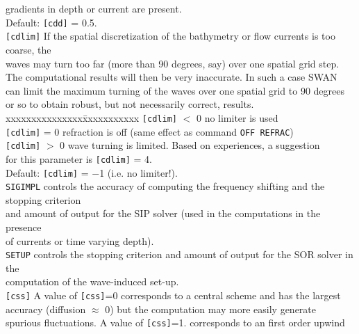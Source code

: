 \documentclass[12pt]{book}
\begin{document}
\begin{tabbing}
                  gradients in depth or current are present.\\
                  Default: {\tt [cdd]} = 0.5.\-\\
{\tt [cdlim]}  \> If the spatial discretization of the bathymetry or flow currents is too coarse, the\+\\
                  waves may turn too far (more than 90 degrees, say) over one spatial grid step.\\
                  The computational results will then be very inaccurate. In such a case SWAN\\
                  can limit the maximum turning of the waves over one spatial grid to 90 degrees\\
                  or so to obtain robust, but not necessarily correct, results.\\
                  \pushtabs
                  xxxxxxxxxxxxxxx\=xxxxxxxxxxx \kill
                  {\tt [cdlim]} $<$ 0 \> no limiter is used\\
                  {\tt [cdlim]} = 0   \> refraction is off (same effect as command {\tt OFF REFRAC})\\
                  {\tt [cdlim]} $>$ 0 \> wave turning is limited. Based on experiences, a suggestion\+\\
                  for this parameter is {\tt [cdlim]} = 4.\-\\
                  \poptabs
                  Default: {\tt [cdlim]} = $-$1 (i.e. no limiter!).\-\\
{\tt SIGIMPL}  \> controls the accuracy of computing the frequency shifting and the stopping criterion\+\\
                  and amount of output for the SIP solver (used in the computations in the presence\\
                  of currents or time varying depth).\-\\
{\tt SETUP}    \> controls the stopping criterion and amount of output for the SOR solver in the\+\\
                  computation of the wave-induced set-up.\-\\
{\tt [css]}    \> A value of {\tt [css]}=0 corresponds to a central scheme and has the largest\+\\
                  accuracy (diffusion $\approx$ 0) but the computation may more easily generate\\
                  spurious fluctuations. A value of {\tt [css]}=1. corresponds to an first order upwind\\

\end{tabbing}
\end{document}
